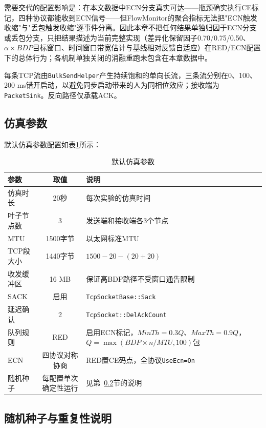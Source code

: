 需要交代的配置影响是：在本文数据中ECN分支真实可达——瓶颈确实执行CE标记，四种协议都能收到ECN信号——但FlowMonitor的聚合指标无法把"ECN触发收缩"与"丢包触发收缩"逐事件分离。因此本章不把任何结果单独归因于ECN分支或丢包分支，只把结果描述为当前完整实现（差异化保留因子0.70/0.75/0.50、$\alpha \times BDP$目标窗口、时间窗口带宽估计与基线相对反馈自适应）在RED/ECN配置下的总体行为；各机制单独关闭的消融重跑未包含在本章数据中。

每条TCP流由\texttt{BulkSendHelper}产生持续饱和的单向长流，三条流分别在0、100、200 ms错开启动，以避免同步启动带来的人为同相位效应；接收端为\texttt{PacketSink}。反向路径仅承载ACK。

\subsection{仿真参数}

默认仿真参数配置如表\ref{tab:params}所示：

\begin{table}[htbp]
\centering
\caption{默认仿真参数}
\label{tab:params}
\begin{tabular}{|l|c|l|}
\hline
\textbf{参数} & \textbf{取值} & \textbf{说明} \\
\hline
仿真时长 & 20秒 & 每次实验的仿真时间 \\
叶子节点数 & 3 & 发送端和接收端各3个节点 \\
MTU & 1500字节 & 以太网标准MTU \\
TCP段大小 & 1440字节 & $1500 - 20 - (20+20)$ \\
收发缓冲区 & 16 MB & 保证高BDP路径不受窗口通告限制 \\
SACK & 启用 & \texttt{TcpSocketBase::Sack} \\
延迟确认 & 2 & \texttt{TcpSocket::DelAckCount} \\
队列规则 & RED & 启用ECN标记，$MinTh=0.3Q$、$MaxTh=0.9Q$，$Q=\max(BDP\times n/MTU,100)$包 \\
ECN & 四协议对称协商 & RED置CE码点，全协议\texttt{UseEcn=On} \\
随机种子 & 每配置单次确定性运行 & 见第~\ref{subsec:seed-caveat}节的说明 \\
\hline
\end{tabular}
\end{table}

\subsection{随机种子与重复性说明}
\label{subsec:seed-caveat}

